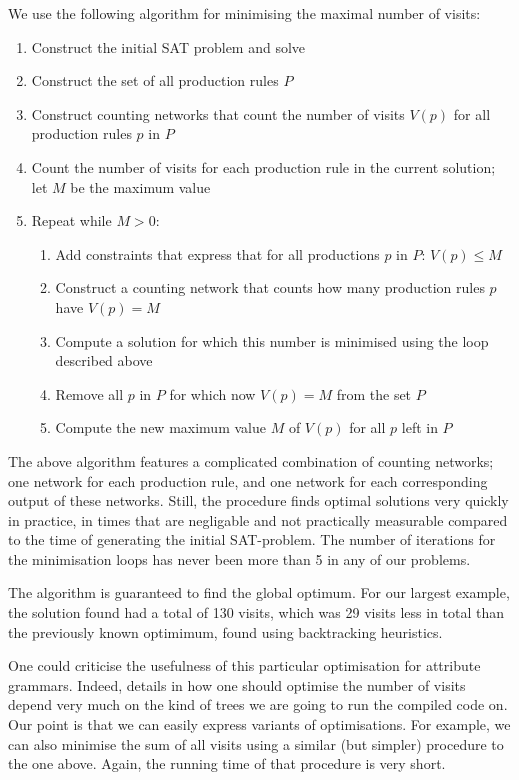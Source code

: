 \documentclass{llncs}
\begin{document}
We use the following algorithm for minimising the maximal number of visits:
\begin{enumerate}
\item Construct the initial SAT problem and solve
\item Construct the set of all production rules $P$
\item Construct counting networks that count the number of visits $V(p)$ for all production rules $p$ in $P$
\item Count the number of visits for each production rule in the current solution; let $M$ be the maximum value 
\item Repeat while $M > 0$:
\begin{enumerate}
\item Add constraints that express that for all productions $p$ in $P$: $V(p) \leq M$
\item Construct a counting network that counts how many production rules $p$ have $V(p)=M$
\item Compute a solution for which this number is minimised using the loop described above
\item Remove all $p$ in $P$ for which now $V(p) = M$ from the set $P$
\item Compute the new maximum value $M$ of $V(p)$ for all $p$ left in $P$
\end{enumerate}
\end{enumerate}

The above algorithm features a complicated combination of counting networks; one network for each production rule, and one network for each corresponding output of these networks. Still, the procedure finds optimal solutions very quickly in practice, in times that are negligable and not practically measurable compared to the time of generating the initial SAT-problem. The number of iterations for the minimisation loops has never been more than 5 in any of our problems.

The algorithm is guaranteed to find the global optimum. For our largest example, the solution found had a total of 130 visits, which was 29 visits less in total than the previously known optimimum, found using backtracking heuristics.

One could criticise the usefulness of this particular optimisation for attribute grammars. Indeed, details in how one should optimise the number of visits depend very much on the kind of trees we are going to run the compiled code on. Our point is that we can easily express variants of optimisations. For example, we can also minimise the sum of all visits using a similar (but simpler) procedure to the one above. Again, the running time of that procedure is very short.
\end{document}
